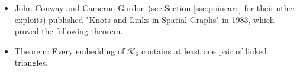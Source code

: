 \documentclass[titlepage]{article}
\numberwithin{figure}{section}
\numberwithin{table}{section}
\numberwithin{equation}{section}
\begin{document}
\begin{itemize}
    \item John Conway and Cameron Gordon (see Section \ref{sse:poincare} for their other exploits) published "Knots and Links in Spatial Graphs" in 1983, which proved the following theorem.
    \item \underline{Theorem}: Every embedding of $\mathcal{K}_6$ contains at least one pair of linked triangles.
    \begin{figure}[h!]
        \centering
\end{figure}
\end{itemize}
\end{document}

